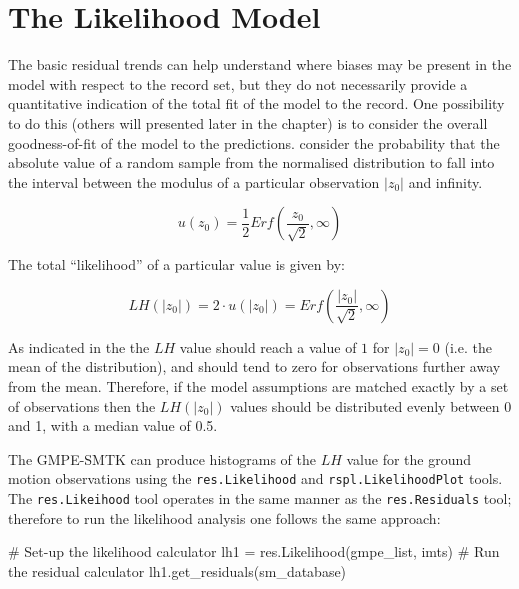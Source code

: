 \section{The Likelihood Model \parencite{Scherbaum_etal2004}}
\label{sec:lh_model}

The basic residual trends can help understand where biases may be present in the model with respect to the record set, but they do not necessarily provide a quantitative indication of the total fit of the model to the record. One possibility to do this (others will presented later in the chapter) is to consider the overall goodness-of-fit of the model to the predictions. \textcite{Scherbaum_etal2004} consider the probability that the absolute value of a random sample from the normalised distribution to fall into the interval between the modulus of a particular observation $|z_0|$ and infinity.

\begin{equation}
u \left( {z_0} \right) = \frac{1}{2} Erf\left( {\frac{z_0}{\sqrt{2}}, \infty} \right)
\end{equation}

The total ``likelihood'' of a particular value is given by:

\begin{equation}
LH \left( {|z_0|} \right) = 2 \cdot u \left( {|z_0|} \right) = Erf \left( {\frac{|z_0|}{\sqrt{2}}, \infty} \right)
\end{equation}

As indicated in \textcite{Scherbaum_etal2004} the the $LH$ value should reach a value of $1$ for $|z_0|=0$ (i.e. the mean of the distribution), and should tend to zero for observations further away from the mean. Therefore, if the model assumptions are matched exactly by a set of observations then the $LH \left( {|z_0|} \right)$ values should be distributed evenly between 0 and 1, with a median value of 0.5. 

The GMPE-SMTK can produce histograms of the $LH$ value for the ground motion observations using the \verb=res.Likelihood= and \verb=rspl.LikelihoodPlot= tools. The \verb=res.Likeihood= tool operates in the same manner as the \verb=res.Residuals= tool; therefore to run the likelihood analysis one follows the same approach:

\begin{python}[frame=single]
# Set-up the likelihood calculator
lh1 = res.Likelihood(gmpe_list, imts)
# Run the residual calculator
lh1.get_residuals(sm_database)
\end{python}

